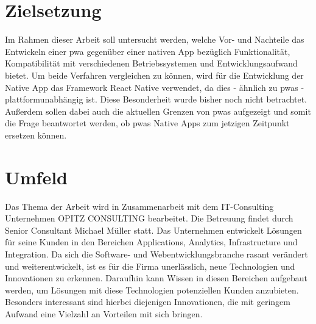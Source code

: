 \section{Zielsetzung}
Im Rahmen dieser Arbeit soll untersucht werden, welche Vor- und Nachteile das Entwickeln einer \ac{pwa} gegenüber einer nativen App bezüglich Funktionalität, Kompatibilität mit verschiedenen Betriebssystemen und Entwicklungsaufwand bietet.
Um beide Verfahren vergleichen zu können, wird für die Entwicklung der Native App das Framework React Native verwendet, da dies - ähnlich zu \acp{pwa} - plattformunabhängig ist.
Diese Besonderheit wurde bisher noch nicht betrachtet. %
Außerdem sollen dabei auch die aktuellen Grenzen von \acp{pwa} aufgezeigt und somit die Frage beantwortet werden, ob \acp{pwa} Native Apps zum jetzigen Zeitpunkt ersetzen können.

\section{Umfeld}
Das Thema der Arbeit wird in Zusammenarbeit mit dem IT-Consulting Unternehmen OPITZ CONSULTING bearbeitet.
Die Betreuung findet durch Senior Consultant Michael Müller statt.
Das Unternehmen entwickelt Lösungen für seine Kunden in den Bereichen Applications, Analytics, Infrastructure und Integration.
Da sich die Software- und Webentwicklungsbranche rasant verändert und weiterentwickelt, ist es für die Firma unerlässlich, neue Technologien und Innovationen zu erkennen.
Daraufhin kann Wissen in diesen Bereichen aufgebaut werden, um Lösungen mit diese Technologien potenziellen Kunden anzubieten.
Besonders interessant sind hierbei diejenigen Innovationen, die mit geringem Aufwand eine Vielzahl an Vorteilen mit sich bringen.

